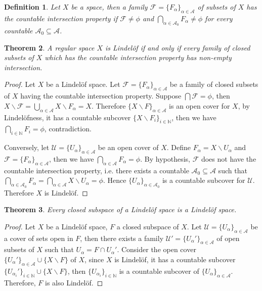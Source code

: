 \documentclass[12pt,oneside,english]{amsbook}
\numberwithin{equation}{section} %
\numberwithin{figure}{section} %
\theoremstyle{plain}
\numberwithin{section}{chapter}
\newtheorem{thm}{Theorem}[section]
\theoremstyle{plain}
\newtheorem{defn}[thm]{Definition}
\begin{document}
\begin{defn}\label{lindelof:def:6}
  Let $X$ be a space, then a family $\mathcal{F} = \{F_{\alpha}\}_{\alpha \in \mathcal{A}}$ of subsets of $X$ has the countable intersection property if $\mathcal{F} \neq \phi$ and $\bigcap_{\alpha \in \mathcal{A}_0}F_{\alpha} \neq \phi$ for every countable $\mathcal{A}_0 \subseteq \mathcal{A}$.
\end{defn}

\begin{thm}\label{lindelof:thm:7}
  A regular space $X$ is Lindel\"{o}f if and only if every family of closed subsets of $X$ which has the countable intersection property has non-empty intersection.
\end{thm}
\begin{proof}
  Let $X$ be a Lindel\"{o}f space. Let $\mathcal{F} = \{F_{\alpha} \}_{\alpha \in \mathcal{A}}$ be a family of closed subsets of $X$ having the countable intersection property. Suppose $\bigcap \mathcal{F} = \phi$, then $X \backslash \mathcal{F} = \bigcup_{\alpha \in \mathcal{A}} X \backslash F_{\alpha} = X$. Therefore $\{X \backslash F\}_{\alpha \in \mathcal{A}}$ is an open cover for $X$, by Lindel\"{o}fness, it has a countable subcover $\{X \backslash F_i\}_{i \in \mathbb{N}}$, then we have $\bigcap_{i \in \mathbb{N}}F_i = \phi$, contradiction.

  Conversely, let $\mathcal{U} = \{U_{\alpha}\}_{\alpha \in \mathcal{A}}$ be an open cover of $X$. Define $F_{\alpha} = X \backslash U_{\alpha}$ and $\mathcal{F} = \{F_{\alpha}\}_{\alpha \in \mathcal{A}}$, then we have $\bigcap_{\alpha \in \mathcal{A}}F_{\alpha} = \phi$. By hypothesis, $\mathcal{F}$ does not have the countable intersection property, i.e. there exists a countable $\mathcal{A}_0 \subseteq \mathcal{A}$ such that $\bigcap_{\alpha \in \mathcal{A}_0}F_{\alpha} = \bigcap_{\alpha \in \mathcal{A}}X\backslash U_{\alpha} = \phi$. Hence $\{U_{\alpha}\}_{\alpha \in \mathcal{A}_0}$ is a countable subcover for $\mathcal{U}$. Therefore $X$ is Lindel\"{o}f.
\end{proof}

\begin{thm}\label{lindelof:thm:8}
  Every closed subspace of a Lindel\"{o}f space is a Lindel\"{o}f space.
\end{thm}
\begin{proof}
  Let $X$ be a Lindel\"{o}f space, $F$ a closed subspace of $X$. Let $\mathcal{U} = \{U_{\alpha}\}_{\alpha \in \mathcal{A}}$ be a cover of sets open in $F$, then there exists a family $\mathcal{U}' = \{U_{\alpha}'\}_{\alpha \in \mathcal{A}}$ of open subsets of $X$ such that $U_{\alpha} = F \cap U_{\alpha}'$. Consider the open cover $\{U_{\alpha}'\}_{\alpha \in \mathcal{A}} \cup \{ X \backslash F\}$ of $X$, since $X$ is Lindel\"{o}f, it has a countable subcover $\{U_{\alpha_i}'\}_{i \in \mathbb{N}} \cup \{ X \backslash F\}$, then $\{U_{\alpha_i}\}_{i \in \mathbb{N}}$ is a countable subcover of $\{U_{\alpha}\}_{\alpha \in \mathcal{A}}$. Therefore, $F$ is also Lindel\"{o}f. 
\end{proof}
\end{document}
